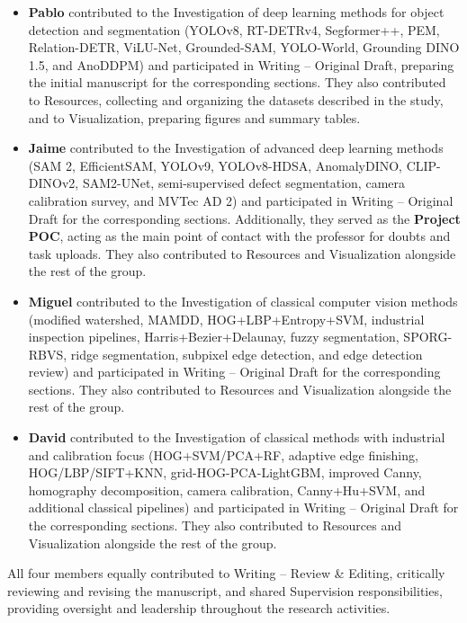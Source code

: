\documentclass[11pt]{article}
\begin{document}
\begin{itemize}

\item \textbf{Pablo} contributed to the Investigation of deep learning methods 
for object detection and segmentation (YOLOv8, RT-DETRv4, Segformer++, PEM, 
Relation-DETR, ViLU-Net, Grounded-SAM, YOLO-World, Grounding DINO 1.5, and 
AnoDDPM) and participated in Writing -- Original Draft, preparing the initial 
manuscript for the corresponding sections. They also contributed to Resources, 
collecting and organizing the datasets described in the study, and to 
Visualization, preparing figures and summary tables.

\item \textbf{Jaime} contributed to the Investigation of advanced deep learning 
methods (SAM 2, EfficientSAM, YOLOv9, YOLOv8-HDSA, AnomalyDINO, CLIP-DINOv2, 
SAM2-UNet, semi-supervised defect segmentation, camera calibration survey, and 
MVTec AD 2) and participated in Writing -- Original Draft for the corresponding 
sections. Additionally, they served as the \textbf{Project POC}, acting as the 
main point of contact with the professor for doubts and task uploads. They also 
contributed to Resources and Visualization alongside the rest of the group.

\item \textbf{Miguel} contributed to the Investigation of classical computer 
vision methods (modified watershed, MAMDD, HOG+LBP+Entropy+SVM, industrial 
inspection pipelines, Harris+Bezier+Delaunay, fuzzy segmentation, SPORG-RBVS, 
ridge segmentation, subpixel edge detection, and edge detection review) and 
participated in Writing -- Original Draft for the corresponding sections. They 
also contributed to Resources and Visualization alongside the rest of the group.

\item \textbf{David} contributed to the Investigation of classical methods with 
industrial and calibration focus (HOG+SVM/PCA+RF, adaptive edge finishing, 
HOG/LBP/SIFT+KNN, grid-HOG-PCA-LightGBM, improved Canny, homography 
decomposition, camera calibration, Canny+Hu+SVM, and additional classical 
pipelines) and participated in Writing -- Original Draft for the corresponding 
sections. They also contributed to Resources and Visualization alongside the 
rest of the group.

\end{itemize}

All four members equally contributed to Writing -- Review \& Editing, critically 
reviewing and revising the manuscript, and shared Supervision responsibilities, 
providing oversight and leadership throughout the research activities.


\medskip

 

\newpage
\end{document}
